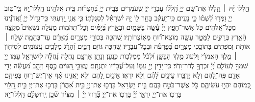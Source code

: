 \documentclass[twoside, openany, parskip=half, 11pt]{book}
\begin{document}
\begin{narrow}
הַ֥לְלוּ יָ֨הּ ׀
הַֽ֭לְלוּ אֶת־שֵׁ֣ם יְיָ֑ הַֽ֝לְל֗וּ עַבְדֵ֥י יְיָ׃
שֶׁ֣֭עֹמְדִים בְּבֵ֣ית יְיָ֑ בְּ֝חַצְר֗וֹת בֵּ֣ית אֱלֹהֵֽינוּ׃
הַֽלְלוּ־יָ֭הּ כִּֽי־ט֣וֹב יְיָ֑ זַמְּר֥וּ לִ֝שְׁמ֗וֹ כִּ֣י נָעִֽים׃
כִּֽי־יַעֲקֹ֗ב בָּחַ֣ר ל֣וֹ יָ֑הּ יִ֝שְׂרָאֵ֗ל לִסְגֻלָּתֽוֹ׃
כִּ֤י אֲנִ֣י יָ֭דַעְתִּי כִּֽי־גָד֣וֹל יְיָ֑ וַ֝אֲדֹנֵ֗ינוּ מִכׇּל־אֱלֹהִֽים׃
כֹּ֤ל אֲשֶׁר־חָפֵ֥ץ יְיָ֗ עָ֫שָׂ֥ה בַּשָּׁמַ֥יִם וּבָאָ֑רֶץ בַּ֝יַּמִּ֗ים וְכׇל־תְּהֹמֽוֹת׃
מַעֲלֶ֣ה נְשִׂאִים֮ מִקְצֵ֢ה הָ֫אָ֥רֶץ בְּרָקִ֣ים לַמָּטָ֣ר עָשָׂ֑ה מֽוֹצֵא־ר֗֝וּחַ מֵאֽוֹצְרוֹתָֽיו׃
שֶׁ֭הִכָּה בְּכוֹרֵ֣י מִצְרָ֑יִם מֵ֝אָדָ֗ם עַד־בְּהֵמָֽה׃
שָׁלַ֤ח ׀ אוֹתֹ֣ת וּ֭מֹפְתִים בְּתוֹכֵ֣כִי מִצְרָ֑יִם בְּ֝פַרְעֹ֗ה וּבְכׇל־עֲבָדָֽיו׃
שֶׁ֭הִכָּה גּוֹיִ֣ם רַבִּ֑ים וְ֝הָרַ֗ג מְלָכִ֥ים עֲצוּמִֽים׃
לְסִיח֤וֹן ׀ מֶ֤לֶךְ הָאֱמֹרִ֗י וּ֭לְעוֹג מֶ֣לֶךְ הַבָּשָׁ֑ן וּ֝לְכֹ֗ל מַמְלְכ֥וֹת כְּנָֽעַן׃
וְנָתַ֣ן אַרְצָ֣ם נַחֲלָ֑ה נַ֝חֲלָ֗ה לְיִשְׂרָאֵ֥ל עַמּֽוֹ׃
יְיָ֭ שִׁמְךָ֣ לְעוֹלָ֑ם יְ֝יָ֗ זִכְרְךָ֥ לְדֹר־וָדֹֽר׃
כִּֽי־יָדִ֣ין יְיָ֣ עַמּ֑וֹ וְעַל־עֲ֝בָדָ֗יו יִתְנֶחָֽם׃
עֲצַבֵּ֣י הַ֭גּוֹיִם כֶּ֣סֶף וְזָהָ֑ב מַ֝עֲשֵׂ֗ה יְדֵ֣י אָדָֽם׃
פֶּֽה־לָ֭הֶם וְלֹ֣א יְדַבֵּ֑רוּ עֵינַ֥יִם לָ֝הֶ֗ם וְלֹ֣א יִרְאֽוּ׃
אׇזְנַ֣יִם לָ֭הֶם וְלֹ֣א יַאֲזִ֑ינוּ אַ֗֝ף אֵין־יֶשׁ־ר֥וּחַ בְּפִיהֶֽם׃
כְּ֭מוֹהֶם יִהְי֣וּ עֹשֵׂיהֶ֑ם כֹּ֖ל אֲשֶׁר־בֹּטֵ֣חַ בָּהֶֽם׃
בֵּ֣ית יִ֭שְׂרָאֵל בָּרְכ֣וּ אֶת־יְיָ֑ בֵּ֥ית אַ֝הֲרֹ֗ן בָּרְכ֥וּ אֶת־יְיָ׃
בֵּ֣ית הַ֭לֵּוִי בָּרְכ֣וּ אֶת־יְיָ֑ יִֽרְאֵ֥י יְ֝יָ֗ בָּרְכ֥וּ אֶת־יְיָ׃
בָּ֘ר֤וּךְ יְיָ֨ ׀ מִצִּיּ֗וֹן שֹׁ֘כֵ֤ן יְֽרוּשָׁלָ֗‍ִם הַֽלְלוּ־יָֽהּ׃




\end{narrow}
\end{document}

